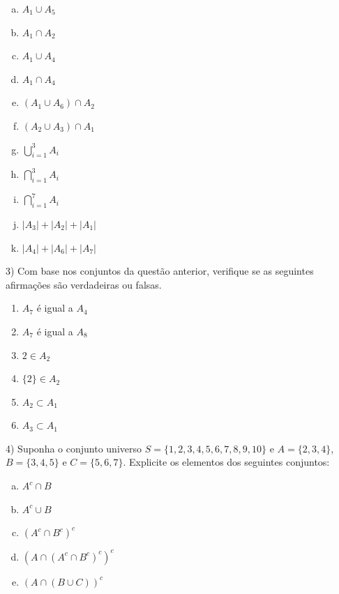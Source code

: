 \documentclass[12pt]{article}
\begin{document}
\begin{enumerate}[a)] %
    \item $A_1 \cup A_5$
    \item $A_1 \cap A_2$
    \item $A_1 \cup A_4$
    \item $A_1 \cap A_4$
    \item $(A_1 \cup A_6) \cap A_2$
    \item $(A_2 \cup A_3) \cap A_1$
    \item $\bigcup\limits_{i=1}^{3} A_i$
    \item $\bigcap\limits_{i=1}^{3} A_i$
    \item $\bigcap\limits_{i=1}^{7} A_i$
    \item $|A_3| + |A_2| + |A_1|$
    \item $|A_4| + |A_6| + |A_7|$
\end{enumerate}
\vspace{10px}

\vspace{5px}

3) Com base nos conjuntos da questão anterior, verifique se as seguintes afirmações são verdadeiras ou falsas. 

\begin{enumerate}
    \item $A_7$ é igual a $A_4$
    \item $A_7$ é igual a $A_8$
    \item $2 \in A_2$
    \item $\{2\} \in A_2$
    \item $A_2 \subset A_1$
    \item $A_3 \subset A_1$
\end{enumerate}

\vspace{5px}

4) Suponha o conjunto universo $S= \{1,2,3,4,5,6,7,8,9,10\}$ e $A=\{2,3,4\}$, $B=\{3,4,5\}$ e $C=\{5,6,7\}$. Explicite os elementos dos seguintes conjuntos:

\begin{enumerate}[a)] %
    \item $A^c \cap B$
    \item $A^c \cup B$
    \item $(A^c \cap B^c)^c$
    \item $(A \cap (A^c \cap B^c)^c)^c$
    \item $(A \cap (B \cup C))^c$
\end{enumerate}
\vspace{10px}
\end{document}

